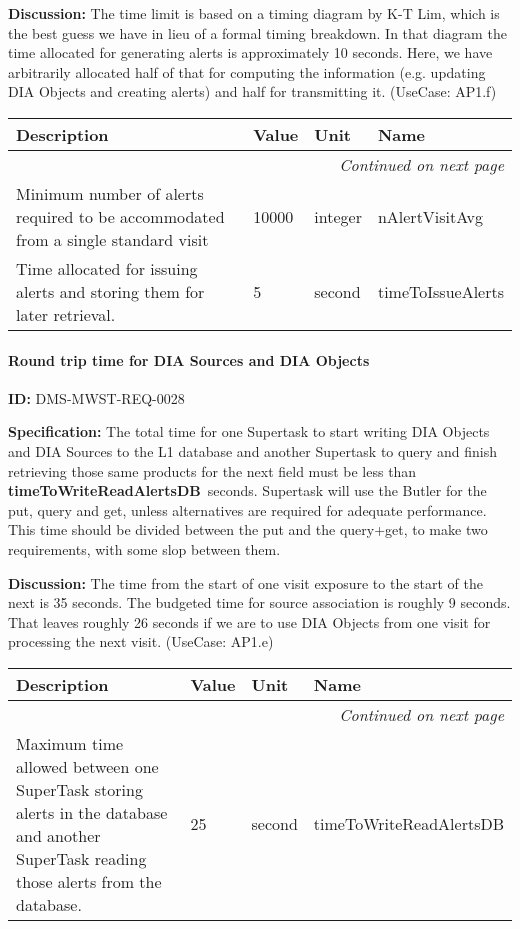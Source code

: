 \documentclass[SE,toc,lsstdraft]{lsstdoc}
\makeatletter
\newcommand{\paramname}[1]{\hspace{0pt}#1}
\newcommand{\unitname}[1]{\hspace{0pt}#1}
\newenvironment{parameters}[0]{%
\setlength\LTleft{0pt}
\setlength\LTright{\fill}
\begin{small}
\begin{longtable}[]{|p{0.49\textwidth}|l|p{0.6in}|p{1.70in}@{}|}

\hline \textbf{Description} & \textbf{Value} & \textbf{Unit} & \textbf{Name} \\ \hline
\endhead

\hline \multicolumn{4}{r}{\emph{Continued on next page}} \\
\endfoot

\hline\hline
\endlastfoot
}{%
\hline
\end{longtable}
\end{small}
}
\makeatother
\begin{document}
\textbf{Discussion:}
The time limit is based on a timing diagram by K-T Lim, which is the best guess we have in lieu of a formal timing breakdown. In that diagram the time allocated for generating alerts is approximately 10 seconds. Here, we have arbitrarily allocated half of that for computing the information (e.g. updating DIA Objects and creating alerts) and half for transmitting it. (UseCase: AP1.f)

\begin{parameters}
Minimum number of alerts required to be accommodated from a single standard visit
&
10000
&
\unitname{%
integer
}
&
\paramname{%
nAlertVisitAvg
} \\\hline
Time allocated for issuing alerts and storing them for later retrieval.
&
5
&
\unitname{%
second
}
&
\paramname{%
timeToIssueAlerts
} \\\hline
\end{parameters}

\paragraph{Round trip time for DIA Sources and DIA Objects}\hfill  %

\label{DMS-MWST-REQ-0028}
\textbf{ID:} DMS-MWST-REQ-0028

\textbf{Specification:}
The total time for one Supertask to start writing DIA Objects and DIA Sources to the L1 database and another Supertask to query and finish retrieving those same products for the next field must be less than \textbf{timeToWriteReadAlertsDB} seconds. Supertask will use the Butler for the put, query and get, unless alternatives are required for adequate performance. This time should be divided between the put and the query+get, to make two requirements, with some slop between them.

\textbf{Discussion:}
The time from the start of one visit exposure to the start of the next is 35 seconds. The budgeted time for source association is roughly 9 seconds. That leaves roughly 26 seconds if we are to use DIA Objects from one visit for processing the next visit. (UseCase: AP1.e)

\begin{parameters}
Maximum time allowed between one SuperTask storing alerts in the database and another SuperTask reading those alerts from the database.
&
25
&
\unitname{%
second
}
&
\paramname{%
timeToWriteReadAlertsDB
} \\\hline
\end{parameters}
\end{document}
